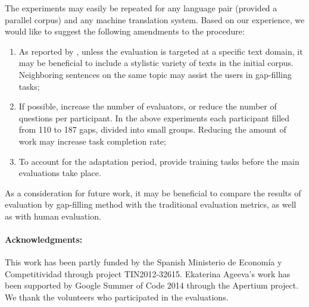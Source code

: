 \documentclass[11pt]{article}
\newcommand{\comment}[1]{}
\begin{document}
The experiments may easily be repeated for any language pair (provided a parallel corpus) and
any machine translation system. Based on our experience, we would like to suggest the following amendments to the procedure:
\begin{enumerate}\itemsep -0.3ex
\item As reported by \cite{oregan13}, unless the evaluation is targeted at a specific text domain, it may be beneficial to include a stylistic variety of texts in the initial corpus. Neighboring sentences on the same topic may assist the users in gap-filling tasks;
\item If possible, increase the number of evaluators, or reduce the number of questions per participant. In the above experiments each participant filled from 110 to 187 gaps, divided into small groups. Reducing the amount of work may increase task completion rate;\comment{MLF's crazy idea: recaptchas?}\comment{EA: the participants did not leave the gaps empty, they just did not attempt the next portions of evaluation after finishing some and getting bored. or did I misunderstand the use of captchas? }
\item To account for the adaptation period, provide training tasks before the main evaluations take place.
\end{enumerate}

As a consideration for future work, it may be beneficial to compare the results of evaluation by gap-filling method with the traditional evaluation metrics, as well as with human evaluation.

\paragraph{Acknowledgments:} This work has been partly funded by the Spanish Ministerio de Econom{\'i}a y Competitividad through project TIN2012-32615. Ekaterina Ageeva's work has been supported by Google Summer of Code 2014 through the Apertium project. We  thank the volunteers who participated in the evaluations.



\comment{EA: urls do not show up in web citations, how can I fix that?}

\end{document}
